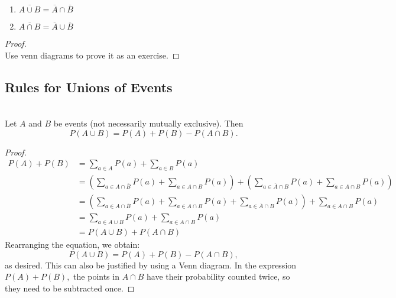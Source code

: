 \begin{theorem}
    \phantom{}
    \begin{enumerate}[label={(\alph*)}]
        \item $\overline{A \cup B} = \overline{A} \cap \overline{B}$
        \item $\overline{A \cap B} = \overline{A} \cup \overline{B}$
    \end{enumerate}
\end{theorem}

\begin{proof}
    \phantom{}  \\
    Use venn diagrams to prove it as an exercise.
\end{proof}




\subsection{Rules for Unions of Events}

\begin{theorem}
    \phantom{}  \\
    Let $A$ and $B$ be events (not necessarily mutually exclusive). Then
    \[P(A \cup B) = P(A) +P(B) - P(A \cap B).\]
\end{theorem}

\begin{proof}
    \begin{align*}
        P(A) + P(B) &= \sum_{a \in A} P(a) + \sum_{a \in B} P(a)    \\
                    &= \left(\sum_{a \in A \cap \overline{B} } P(a) + \sum_{a \in A \cap B} P(a)\right)
                       + \left(\sum_{a \in \overline{A} \cap B} P(a) + \sum_{a \in A \cap B} P(a)\right)  \\
                    &= \left(\sum_{a \in A \cap \overline{B}} P(a) + \sum_{a \in A \cap B} P(a)
                             + \sum_{a \in \overline{A} \cap B} P(a)\right) + \sum_{a \in A \cap B} P(a)  \\
                    &= \sum_{a \in A \cup B} P(a) + \sum_{a \in A \cap B} P(a)  \\
                    &= P(A \cup B) + P(A \cap B)
    \end{align*}
    Rearranging the equation, we obtain:
    \[P(A \cup B) = P(A) +P(B) - P(A \cap B),\]
    as desired. This can also be justified by using a Venn diagram. In the expression $P(A) + P(B),$
    the points in $A \cap B$ have their probability counted twice, so they need to be subtracted once.
\end{proof}

